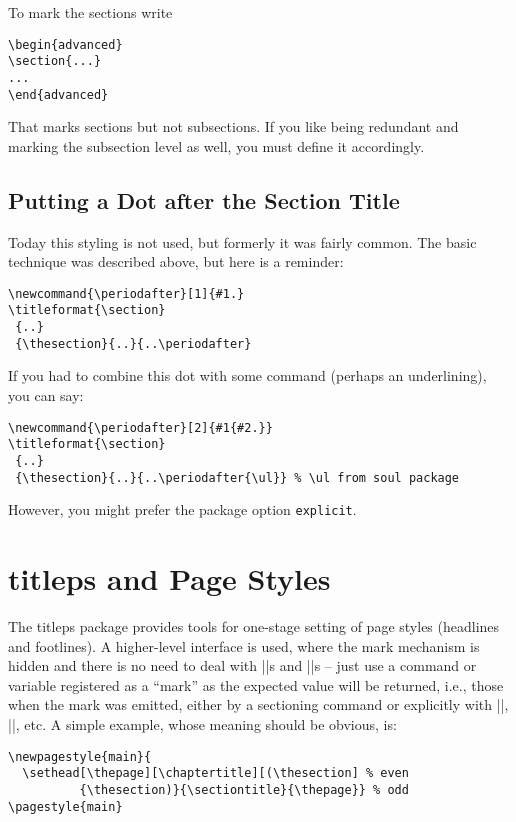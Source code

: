 \documentclass[a4paper]{ltxguide}
\begin{document}
To mark the sections write
\begin{verbatim}
\begin{advanced}
\section{...}
...
\end{advanced}
\end{verbatim}

That marks sections but not subsections. If you like being
redundant and marking the subsection level as well, you must
define it accordingly.

\subsection{Putting a Dot after the Section Title}
\label{sec:dotafter}

Today this styling is not used, but formerly it was fairly common.
The basic technique was described above, but here is a reminder:
\begin{verbatim}
\newcommand{\periodafter}[1]{#1.}
\titleformat{\section}
 {..}
 {\thesection}{..}{..\periodafter}
\end{verbatim}

If you had to combine this dot with some command (perhaps an
underlining), you can say:
\begin{verbatim}
\newcommand{\periodafter}[2]{#1{#2.}}
\titleformat{\section}
 {..}
 {\thesection}{..}{..\periodafter{\ul}} % \ul from soul package
\end{verbatim}

However, you might prefer the package option \texttt{explicit}.

\section{\textsf{titleps} and Page Styles}

The \textsf{titleps} package provides tools for one-stage setting of
page styles (headlines and footlines).  A higher-level interface is
used, where the mark mechanism is hidden and there is no need to deal
with |\leftmark|s and |\rightmark|s -- just use a command or variable
registered as a ``mark'' as the expected value will be returned, i.e.,
those when the mark was emitted, either by a sectioning command or
explicitly with |\chaptermark|, |\sectionmark|, etc.  A simple
example, whose meaning should be obvious, is:
\begin{verbatim}
\newpagestyle{main}{
  \sethead[\thepage][\chaptertitle][(\thesection] % even
          {\thesection)}{\sectiontitle}{\thepage}} % odd
\pagestyle{main}
\end{verbatim}
\end{document}
